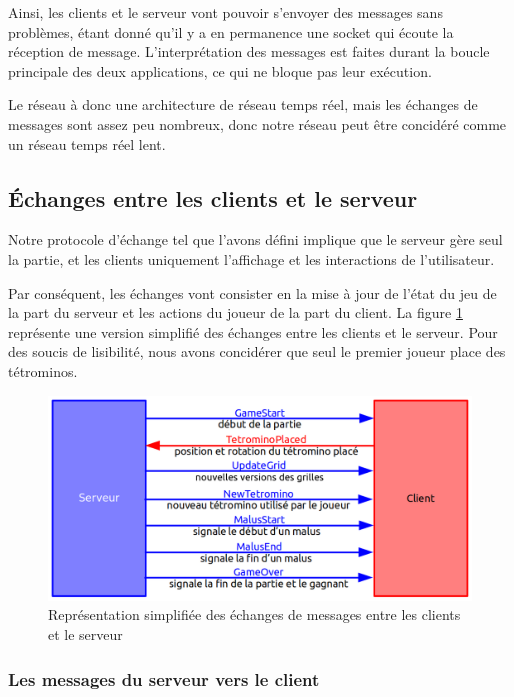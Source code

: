\documentclass[a4paper, 12pt]{article}
\begin{document}
			Ainsi, les clients et le serveur vont pouvoir s'envoyer des messages sans problèmes, étant donné qu'il y a en permanence une socket qui écoute la réception de message. L'interprétation des messages est faites durant la boucle principale des deux applications, ce qui ne bloque pas leur exécution.

			Le réseau à donc une architecture de réseau temps réel, mais les échanges de messages sont assez peu nombreux, donc notre réseau peut être concidéré comme un réseau temps réel lent.

		\subsection{\'Echanges entre les clients et le serveur}

			Notre protocole d'échange tel que l'avons défini implique que le serveur gère seul la partie, et les clients uniquement l'affichage et les interactions de l'utilisateur.

			Par conséquent, les échanges vont consister en la mise à jour de l'état du jeu de la part du serveur et les actions du joueur de la part du client. 
			La figure \ref{fig:echange} représente une version simplifié des échanges entre les clients et le serveur. Pour des soucis de lisibilité, nous avons concidérer que seul le premier joueur place des tétrominos.

			\begin{figure}[bt]
				\centering
				\includegraphics[scale=0.45]{img/ech.png}
				\caption{Représentation simplifiée des échanges de messages entre les clients et le serveur}
				\label{fig:echange}
			\end{figure}


			\subsubsection{Les messages du serveur vers le client}
\end{document}
